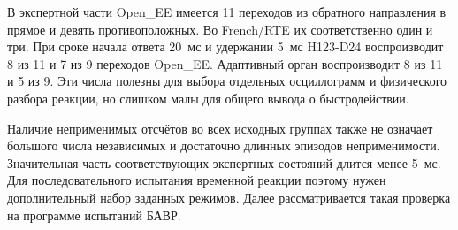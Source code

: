 В экспертной части Open\_EE имеется
11 переходов из обратного направления в прямое
и девять противоположных.
Во French/RTE их соответственно один и три.
При сроке начала ответа 20~мс и удержании 5~мс
H123-D24 воспроизводит 8 из 11 и 7 из 9
переходов Open\_EE.
Адаптивный орган воспроизводит 8 из 11 и 5 из 9.
Эти числа полезны для выбора отдельных осциллограмм
и физического разбора реакции,
но слишком малы для общего вывода о быстродействии.

Наличие неприменимых отсчётов во всех исходных группах
также не означает большого числа независимых
и достаточно длинных эпизодов неприменимости.
Значительная часть соответствующих экспертных состояний
длится менее 5~мс.
Для последовательного испытания временной реакции
поэтому нужен дополнительный набор заданных режимов.
Далее рассматривается такая проверка
на программе испытаний БАВР.
